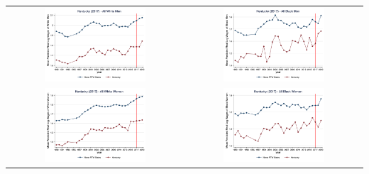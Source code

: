 \documentclass[11pt]{article}
\begin{document}
{\pagebreak
\begin{landscape}
\begin{table}[h!]
    \centering
    \label{fig:pta_ky}
    \begin{tabular}{c c}
          \includegraphics[width = 0.6\textwidth, keepaspectratio]{figures/pta/fin_wm_ky.png} & \includegraphics[width = 0.6\textwidth, keepaspectratio]{figures/pta/fin_bm_ky.png} \\
          \includegraphics[width = 0.6\textwidth, keepaspectratio]{figures/pta/fin_wf_ky.png} & \includegraphics[width = 0.6\textwidth, keepaspectratio]{figures/pta/fin_bf_ky.png}
    \end{tabular}
\end{table}
\end{landscape}

}
\end{document}
